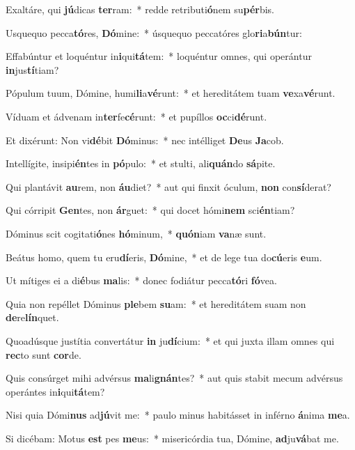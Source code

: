 \item Exaltáre, qui \textbf{jú}dicas \textbf{ter}ram:~* redde retributi\textbf{ó}nem su\textbf{pér}bis.
\item Usquequo pecca\textbf{tó}res, \textbf{Dó}mine:~* úsquequo peccatóres glo\textbf{ri}a\textbf{bún}tur:
\item Effabúntur et loquéntur in\textbf{i}qui\textbf{tá}tem:~* loquéntur omnes, qui operántur \textbf{in}jus\textbf{tí}tiam?
\item Pópulum tuum, Dómine, humi\textbf{li}a\textbf{vé}runt:~* et hereditátem tuam \textbf{ve}xa\textbf{vé}runt.
\item Víduam et ádvenam in\textbf{ter}fe\textbf{cé}runt:~* et pupíllos \textbf{oc}ci\textbf{dé}runt.
\item Et dixérunt: Non vi\textbf{dé}bit \textbf{Dó}minus:~* nec intélliget \textbf{De}us \textbf{Ja}cob.
\item Intellígite, insipi\textbf{én}tes in \textbf{pó}pulo:~* et stulti, ali\textbf{quán}do \textbf{sá}pite.
\item Qui plantávit \textbf{au}rem, non \textbf{áu}diet?~* aut qui finxit óculum, \textbf{non} con\textbf{sí}derat?
\item Qui córripit \textbf{Gen}tes, non \textbf{ár}guet:~* qui docet hómi\textbf{nem} sci\textbf{én}tiam?
\item Dóminus scit cogitati\textbf{ó}nes \textbf{hó}minum,~* \textbf{quón}iam \textbf{va}næ sunt.
\item Beátus homo, quem tu eru\textbf{dí}eris, \textbf{Dó}mine,~* et de lege tua do\textbf{cú}eris \textbf{e}um.
\item Ut mítiges ei a di\textbf{é}bus \textbf{ma}lis:~* donec fodiátur pecca\textbf{tó}ri \textbf{fó}vea.
\item Quia non repéllet Dóminus \textbf{ple}bem \textbf{su}am:~* et hereditátem suam non \textbf{de}re\textbf{lín}quet.
\item Quoadúsque justítia convertátur \textbf{in} ju\textbf{dí}cium:~* et qui juxta illam omnes qui \textbf{rec}to sunt \textbf{cor}de.
\item Quis consúrget mihi advérsus \textbf{ma}li\textbf{gnán}tes?~* aut quis stabit mecum advérsus operántes in\textbf{i}qui\textbf{tá}tem?
\item Nisi quia Dómi\textbf{nus} ad\textbf{jú}vit me:~* paulo minus habitásset in inférno \textbf{á}nima \textbf{me}a.
\item Si dicébam: Motus \textbf{est} pes \textbf{me}us:~* misericórdia tua, Dómine, \textbf{ad}ju\textbf{vá}bat me.
